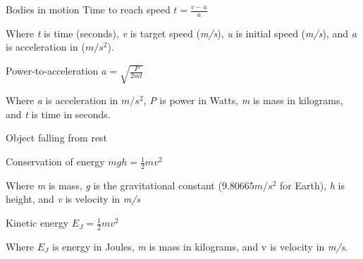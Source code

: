 \documentclass[fleqn]{article}
\begin{document}
	\begin{center}

		{\LARGE Bodies in motion} \bigbreak
		Time to reach speed \smallbreak
		$ t = \frac{v - u}{a} $ \bigbreak

	\end{center}

	Where {\it t} is time (seconds), {\it v} is target speed ({\it m/s}), {\it u} is initial speed ({\it m/s}), and {\it a} is acceleration in ($ m/s^2 $). \bigbreak
	\bigbreak

	\begin{center}

		Power-to-acceleration \smallbreak
		$ a = \sqrt{\frac {P}{2mt}} $ \bigbreak

	\end{center}

	Where {\it a} is acceleration in $ m/s^2 $, {\it P} is power in Watts, {\it m} is mass in kilograms, and {\it t} is time in seconds. \bigbreak
	\bigbreak

	\begin{center}

		Object falling from rest \medbreak

		Conservation of energy \smallbreak
		$ mgh = \frac{1}{2} mv^2 $ \bigbreak

	\end{center}

	Where {\it m} is mass, {\it g} is the gravitational constant ($ 9.80665m/s^2 $ for Earth), {\it h} is height, and {\it v} is velocity in {\it m/s} \bigbreak
	\bigbreak

	\begin{center}

		Kinetic energy \smallbreak
		$ E_J = \frac{1}{2} mv^2 $ \smallbreak

	\end{center}

	Where $ E_J $ is energy in Joules, {\it m} is mass in kilograms, and v is velocity in {\it m/s}.
\end{document}
